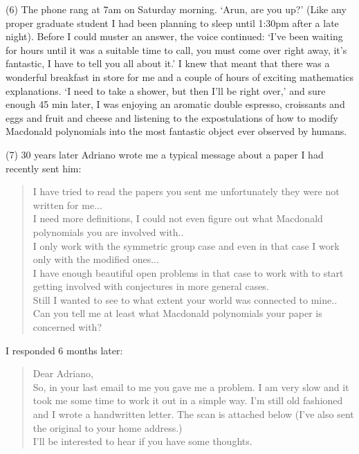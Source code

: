 \documentclass{notices}
\begin{document}
(6) The phone rang at 7am on Saturday morning.  `Arun, are you up?'
(Like any proper graduate student
I had been planning to sleep until 1:30pm after a late night).
Before I could muster an answer, the voice continued:
`I've been waiting for hours until it was a suitable time to call,  
you must come over right away, it's fantastic, I have to tell you all about it.'
I knew that meant that there was a wonderful breakfast in store for me
and a couple of hours of exciting mathematics explanations.  
`I need to take a shower, but then I'll be right over,'
and sure enough 45 min later,
I was enjoying an aromatic double espresso, croissants and eggs and fruit and cheese
and listening to the expostulations of how to modify Macdonald polynomials
into the most fantastic object ever observed by humans.

(7) 30 years later Adriano wrote me a typical message about a paper I had recently sent him:
\begin{quote}
I have tried to read the papers you sent me
unfortunately they were not written for me...\\
I need more definitions,
I could not even figure out what Macdonald polynomials you are involved with..\\
I only work with the symmetric group case and even in that case
I work only with the modified ones...\\
I have enough beautiful open problems in that case to work with
to start getting involved with conjectures in more general cases.\\
Still I wanted to see to what extent your world was connected to mine..
Can you tell me at least what Macdonald polynomials your paper is concerned with?
\end{quote}

I responded 6 months later:
\begin{quote}
Dear Adriano,\\
So, in your last email to me you gave me a problem.
I am very slow and it took me some time to work it out in a simple way.
I'm still old fashioned and I wrote a handwritten letter.
The scan is attached below
(I've also sent the original to your home address.)\\
I'll be interested to hear if you have some thoughts.
\end{quote}
\end{document}
